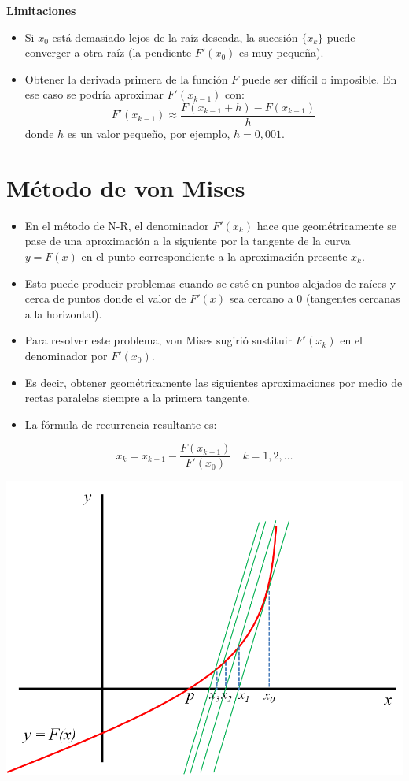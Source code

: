 \documentclass[]{book}
\providecommand{\tightlist}{%
  \setlength{\itemsep}{0pt}\setlength{\parskip}{0pt}}
\begin{document}
\textbf{Limitaciones}

\begin{itemize}
\tightlist
\item
  Si \(x_0\) está demasiado lejos de la raíz deseada, la sucesión \(\{x_k\}\) puede converger a otra raíz (la pendiente \(F'(x_0)\) es muy pequeña).
\item
  Obtener la derivada primera de la función \(F\) puede ser difícil o imposible. En ese caso se podría aproximar \(F'(x_{k-1})\) con:
  \[F'(x_{k-1}) \approx \frac{F(x_{k-1} + h) - F(x_{k-1})}{h}\]
  donde \(h\) es un valor pequeño, por ejemplo, \(h = 0,001\).
\end{itemize}

\hypertarget{muxe9todo-de-von-mises}{%
\section{Método de von Mises}\label{muxe9todo-de-von-mises}}

\begin{itemize}
\tightlist
\item
  En el método de N-R, el denominador \(F'(x_k)\) hace que geométricamente se pase de una aproximación a la siguiente por la tangente de la curva \(y = F(x)\) en el punto correspondiente a la aproximación presente \(x_k\).
\item
  Esto puede producir problemas cuando se esté en puntos alejados de raíces y cerca de puntos donde el valor de \(F'(x)\) sea cercano a 0 (tangentes cercanas a la horizontal).
\item
  Para resolver este problema, von Mises sugirió sustituir \(F'(x_k)\) en el denominador por \(F'(x_0)\).
\item
  Es decir, obtener geométricamente las siguientes aproximaciones por medio de rectas paralelas siempre a la primera tangente.
\item
  La fórmula de recurrencia resultante es:
\end{itemize}

\[
x_k = x_{k-1} - \frac{F(x_{k-1})}{F'(x_{0})} \quad k = 1, 2, \dots
\]

\begin{center}\includegraphics[width=0.75\linewidth]{Plots/U2/vonMises} \end{center}
\end{document}
